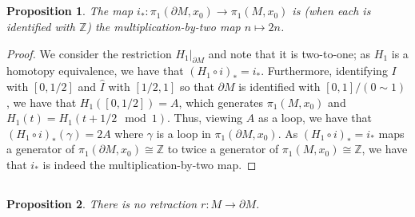 \documentclass[english]{article}
\newcommand{\evat}[3]{\left. #1\right|_{#2}^{#3}}
\newcommand{\restr}[2]{\evat{#1}{#2}{}}
\newcommand{\ZZ}{\mathbb{Z}}
\newcommand{\prt}[1]{\setcounter{subsection}{#1-1}\subsection{}}
\newtheorem*{prop*}{Proposition}
\theoremstyle{remark}
\theoremstyle{definition}
\newcommand{\del}{\partial}
\begin{document}
\prt{2}
\begin{prop*}
	The map $i_*:\pi_1(\del M,x_0)\to \pi_1(M,x_0)$ is (when each is identified with $\ZZ$) the multiplication-by-two map $n\mapsto 2n$. 
\end{prop*}
\begin{proof}
	We consider the restriction $\restr{H_1}{\del M}$ and note that it is two-to-one; as $H_1$ is a homotopy equivalence, we have that $(H_1\circ i)_*=i_*$. Furthermore, identifying $I$ with $[0,1/2]$ and $\hat{I}$ with $[1/2,1]$ so that $\del M$ is identified with $[0,1]/(0\sim 1)$, we have that $H_1([0,1/2])=A$, which generates $\pi_1(M,x_0)$ and $H_1(t)=H_1(t+1/2\mod 1)$. Thus, viewing $A$ as a loop, we have that $(H_1\circ i)_*(\gamma)=2A$ where $\gamma$ is a loop in $\pi_1(\del M,x_0)$. As $(H_1\circ i)_*=i_*$ maps a generator of $ \pi_1(\del M,x_0)\cong \ZZ$ to twice a generator of $\pi_1(M,x_0)\cong \ZZ$, we have that $i_*$ is indeed the multiplication-by-two map.
\end{proof}
\prt{3}
\begin{prop*}
	There is no retraction $r:M\to \del M$.
\end{prop*}
\end{document}
